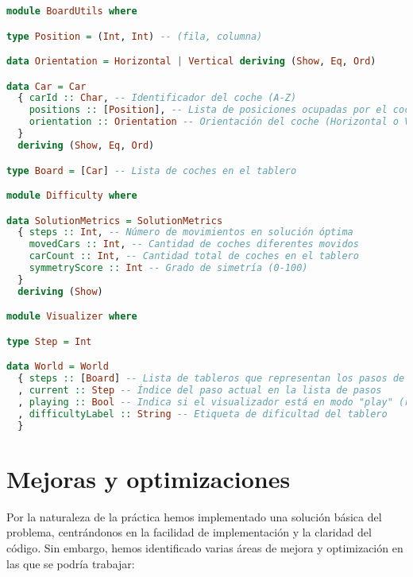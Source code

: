 \documentclass{article}
\begin{document}
\begin{lstlisting}[language=Haskell]
module BoardUtils where

type Position = (Int, Int) -- (fila, columna)

data Orientation = Horizontal | Vertical deriving (Show, Eq, Ord)

data Car = Car
  { carId :: Char, -- Identificador del coche (A-Z)
    positions :: [Position], -- Lista de posiciones ocupadas por el coche
    orientation :: Orientation -- Orientación del coche (Horizontal o Vertical)
  }
  deriving (Show, Eq, Ord)

type Board = [Car] -- Lista de coches en el tablero

module Difficulty where

data SolutionMetrics = SolutionMetrics
  { steps :: Int, -- Número de movimientos en solución óptima
    movedCars :: Int, -- Cantidad de coches diferentes movidos
    carCount :: Int, -- Cantidad total de coches en el tablero
    symmetryScore :: Int -- Grado de simetría (0-100)
  }
  deriving (Show)

module Visualizer where

type Step = Int

data World = World
  { steps :: [Board] -- Lista de tableros que representan los pasos de la solución
  , current :: Step -- Índice del paso actual en la lista de pasos
  , playing :: Bool -- Indica si el visualizador está en modo "play" (reproducción automática)
  , difficultyLabel :: String -- Etiqueta de dificultad del tablero
  }
\end{lstlisting}

\section*{Mejoras y optimizaciones}

Por la naturaleza de la práctica hemos implementado una solución básica del problema, centrándonos en la facilidad de implementación y la claridad del código. Sin embargo, hemos identificado varias áreas de mejora y optimización en las que se podría trabajar:
\end{document}
